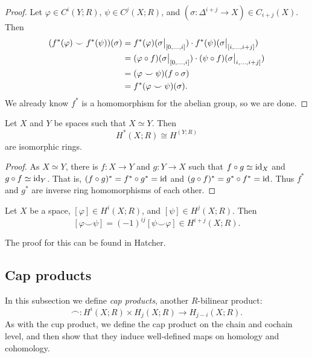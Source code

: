 \begin{proof}
    Let $\varphi \in C^i(Y;R)$, $\psi \in C^j(X;R)$, and $(\sigma: \Delta^{i+j} \to X) \in C_{i+j}(X)$. Then
    \begin{align*}
        (f^*(\varphi) \smile f^*(\psi))(\sigma)
         & = f^*(\varphi)(\restr{\sigma}{[0, \ldots, i]}) \cdot f^*(\psi)(\restr{\sigma}{[i, \ldots, i+j]})          \\
         & = (\varphi \circ f)(\restr{\sigma}{[0, \ldots, i]}) \cdot (\psi \circ f)(\restr{\sigma}{i, \ldots, i+j]}) \\
         & = (\varphi \smile \psi)(f \circ \sigma)                                                                   \\
         & = f^*(\varphi \smile \psi)(\sigma).
    \end{align*}
    We already know $f^*$ is a homomorphism for the abelian group, so we are done.
\end{proof}

\begin{corollary}
    Let $X$ and $Y$ be spaces such that $X \simeq Y$. Then
    \[ H^*(X;R) \cong H^(Y;R) \]
    are isomorphic rings.
\end{corollary}

\begin{proof}
    As $X \simeq Y$, there is $f: X \to Y$ and $g: Y \to X$ such that $f \circ g \simeq \operatorname{id}_X$ and $g \circ f \simeq \operatorname{id}_Y$. That is, $(f \circ g)^* = f^* \circ g^* = \operatorname{id}$ and $(g \circ f)^* = g^* \circ f^* = \operatorname{id}$. Thus $f^*$ and $g^*$ are inverse ring homomorphisms of each other.
\end{proof}

\begin{theorem}
    Let $X$ be a space, $[\varphi] \in H^i(X;R)$, and $[\psi] \in H^j(X;R)$. Then
    \[ [\varphi \smile \psi] = (-1)^{ij} [\psi \smile \varphi] \in H^{i+j}(X;R). \]
\end{theorem}

The proof for this can be found in Hatcher.


\subsection{Cap products}

In this subsection we define \emph{cap products}, another $R$-bilinear product:
\[ {\frown}: H^i(X;R) \times H_j(X; R) \to H_{j - i}(X; R). \]
As with the cup product, we define the cap product on the chain and cochain level, and then show that they induce well-defined maps on homology and cohomology.

